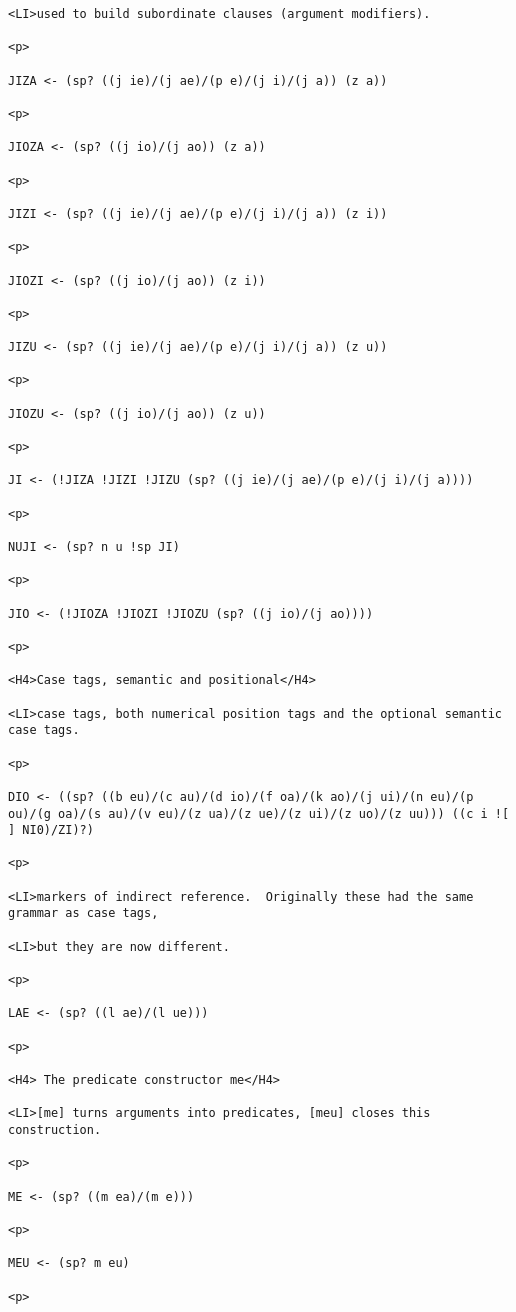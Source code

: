 \documentclass[12pt]{article}
\begin{document}
\begin{lstlisting}
<LI>used to build subordinate clauses (argument modifiers).

<p>

JIZA <- (sp? ((j ie)/(j ae)/(p e)/(j i)/(j a)) (z a))

<p>

JIOZA <- (sp? ((j io)/(j ao)) (z a))

<p>

JIZI <- (sp? ((j ie)/(j ae)/(p e)/(j i)/(j a)) (z i))

<p>

JIOZI <- (sp? ((j io)/(j ao)) (z i))

<p>

JIZU <- (sp? ((j ie)/(j ae)/(p e)/(j i)/(j a)) (z u))

<p>

JIOZU <- (sp? ((j io)/(j ao)) (z u))

<p>

JI <- (!JIZA !JIZI !JIZU (sp? ((j ie)/(j ae)/(p e)/(j i)/(j a))))

<p>

NUJI <- (sp? n u !sp JI)

<p>

JIO <- (!JIOZA !JIOZI !JIOZU (sp? ((j io)/(j ao))))

<p>

<H4>Case tags, semantic and positional</H4>

<LI>case tags, both numerical position tags and the optional semantic case tags.

<p>

DIO <- ((sp? ((b eu)/(c au)/(d io)/(f oa)/(k ao)/(j ui)/(n eu)/(p ou)/(g oa)/(s au)/(v eu)/(z ua)/(z ue)/(z ui)/(z uo)/(z uu))) ((c i ![ ] NI0)/ZI)?)

<p>

<LI>markers of indirect reference.  Originally these had the same grammar as case tags,

<LI>but they are now different.

<p>

LAE <- (sp? ((l ae)/(l ue)))

<p>

<H4> The predicate constructor me</H4>

<LI>[me] turns arguments into predicates, [meu] closes this construction.

<p>

ME <- (sp? ((m ea)/(m e)))

<p>

MEU <- (sp? m eu)

<p>


\end{lstlisting}
\end{document}
